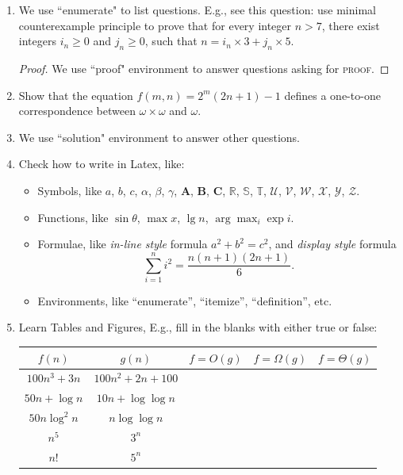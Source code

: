 \documentclass[12pt,a4paper]{article}
\makeatletter
\newtheorem*{solution}{Solution}
\theoremstyle{definition}
\renewenvironment{solution}[1][Solution] {\par\pushQED{\qed}\normalfont\topsep6\p@\@plus6\p@\relax\trivlist\item[\hskip\labelsep\bfseries#1\@addpunct{.}]\ignorespaces}{\popQED\endtrivlist\@endpefalse} \makeatother
\makeatother
\begin{document}
\begin{enumerate}

\item {\color{blue}We use ``enumerate" to list questions. E.g., see this question:} use minimal counterexample principle to prove that for every integer $n>7$, there exist integers $i_n\ge 0$ and $j_n\ge 0$, such that $n = i_n \times 3 + j_n \times 5$.

\begin{proof}
We use ``proof" environment to answer questions asking for \textsc{proof}.
\end{proof}

\item Show that the equation $f(m,n)=2^m(2n+1)-1$ defines a one-to-one correspondence between $\omega \times \omega$ and $\omega$.

\begin{solution}
We use ``solution" environment to answer other questions.
\end{solution}

\item Check how to write in Latex, like:

\begin{itemize}
\item Symbols, like $a$, $b$, $c$, $\alpha$, $\beta$, $\gamma$, $\mathbf{A}$, $\mathbf{B}$, $\mathbf{C}$, $\mathbb{R}$, $\mathbb{S}$, $\mathbb{T}$, $\mathcal{U}$, $\mathcal{V}$, $\mathcal{W}$, $\mathscr{X}$, $\mathscr{Y}$, $\mathscr{Z}$.
\item Functions, like $\sin\theta$, $\max x$, $\lg n$, $\arg \max_i \exp i$.
\item Formulae, like \emph{in-line style} formula $a^2+b^2=c^2$, and \emph{display style} formula $$\sum_{i=1}^n i^2 = \frac{n(n+1)(2n+1)}{6}.$$
\item Environments, like ``enumerate'', ``itemize'', ``definition'', etc.
\end{itemize}

\item Learn Tables and Figures, E.g., fill in the blanks with either true or false:

\begin{table}[h]
	\centering
	\begin{tabular}{|c|c|c|c|c|}
		\hline
		$f(n)$ & $g(n)$ & $f=O(g)$ & $f=\Omega(g)$ & $f=\Theta(g)$ \\
		\hline
		\hline
		$100n^3+3n$ & $100n^2+2n+100$ &  &  & \\
		\hline
		$50n+\log n$ & $10n+\log \log n$ &  &  &  \\
		\hline
		$50n\log^2 n$ & $n \log\log n$ &  &  &  \\
		\hline
		$n^5$ & $3^n$ &  &  &  \\
		\hline
		$n!$ & $5^n$ &  &  &  \\
		\hline
	\end{tabular}
\end{table}


\end{enumerate}
\end{document}
